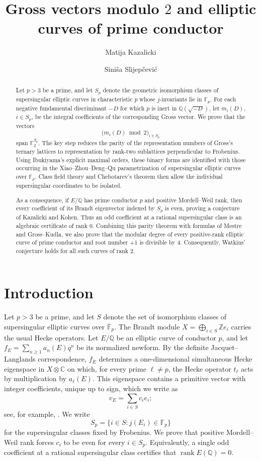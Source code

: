 \documentclass[11pt]{amsart}
\title[Gross vectors modulo $2$]{Gross vectors modulo $2$ and elliptic curves of prime conductor}
\author{Matija Kazalicki}
\author{Sini\v sa Slijep\v cevi\'c}
\date{}
\theoremstyle{definition}
\theoremstyle{remark}
\newcommand{\Q}{\mathbb{Q}}
\newcommand{\Z}{\mathbb{Z}}
\newcommand{\F}{\mathbb{F}}
\begin{document}
\begin{abstract}
Let $p>3$ be a prime, and let $S_p$ denote the geometric isomorphism
classes of supersingular elliptic curves in characteristic $p$ whose
$j$-invariants lie in $\F_p$. For each negative fundamental discriminant
$-D$ for which $p$ is inert in $\Q(\sqrt{-D})$, let $m_i(D)$,
$i\in S_p$, be the integral coefficients of the corresponding Gross
vector. We prove that the vectors
\[
  \bigl(m_i(D)\bmod2\bigr)_{i\in S_p}
\]
span $\F_2^{S_p}$. The key step reduces the parity of the representation
numbers of Gross's ternary lattices to representation by rank-two
sublattices perpendicular to Frobenius. Using Ibukiyama's explicit
maximal orders, these binary forms are identified with those occurring
in the Xiao--Zhou--Deng--Qu parametrization of supersingular elliptic
curves over $\F_p$. Class field theory and Chebotarev's theorem then
allow the individual supersingular coordinates to be isolated.

As a consequence, if $E/\Q$ has prime conductor $p$ and positive
Mordell--Weil rank, then every coefficient of its Brandt eigenvector
indexed by $S_p$ is even, proving a conjecture of Kazalicki and Kohen.
Thus an odd coefficient at a rational supersingular class is an algebraic
certificate of rank $0$. Combining this parity theorem with formulas of
Mestre and Gross--Kudla, we also prove that the modular degree of every
positive-rank elliptic curve of prime conductor and root number $+1$ is
divisible by $4$. Consequently, Watkins' conjecture holds for all such
curves of rank $2$.
\end{abstract}

\maketitle
\enlargethispage{8pt}

\section{Introduction}

Let $p>3$ be a prime, and let $S$ denote the set of isomorphism classes of supersingular elliptic curves over $\overline{\F}_p$. The Brandt module $X=\bigoplus_{i\in S}\Z e_i$ carries the usual Hecke operators. Let $E/\Q$ be an elliptic curve of conductor $p$, and let $f_E=\sum_{n\ge1}a_n(E)q^n$ be its normalized newform. By the definite Jacquet--Langlands correspondence, $f_E$ determines a one-dimensional simultaneous Hecke eigenspace in $X\otimes\mathbb C$ on which, for every prime $\ell\ne p$, the Hecke operator $t_\ell$ acts by multiplication by $a_\ell(E)$. This eigenspace contains a primitive vector with integer coefficients, unique up to sign, which we write as
\[
  v_E=\sum_{i\in S}c_i e_i;
\]
see, for example, \cite[Section~5]{Gross1987}.  We write
\[
  S_p=\{i\in S:j(E_i)\in\F_p\}
\]
for the supersingular classes fixed by Frobenius. We prove that positive Mordell--Weil rank forces $c_i$ to be even for every $i\in S_p$. Equivalently, a single odd coefficient at a rational supersingular class certifies that $\operatorname{rank}E(\Q)=0$.
\end{document}
